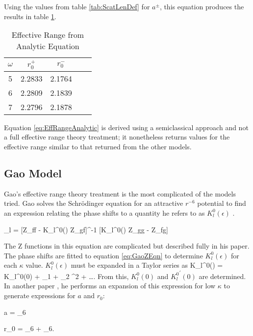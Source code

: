 \documentclass[Dissertation.tex]{subfiles}
\begin{document}
\noindent Using the values from table \ref{tab:ScatLenDef} for $a^\pm$, this equation produces the results in table \ref{tab:EffRangeArriola}.

\begin{table}[H]
\centering
\begin{tabular}{c c c c c}
\toprule
$\omega$ & $r_0^+$ & $r_0^-$ \\
\midrule
5 & 2.2833 & 2.1764 \\
6 & 2.2809 & 2.1839 \\
7 & 2.2796 & 2.1878 \\
\bottomrule
\end{tabular}
\caption{Effective Range from Analytic Equation}
\label{tab:EffRangeArriola}
\end{table}

Equation \ref{eq:EffRangeAnalytic} is derived using a semiclassical approach and not a full effective range theory treatment; it nonetheless returns values for the effective range similar to that returned from the other models.


\subsection{Gao Model}
Gao's effective range theory treatment is the most complicated of the models tried. Gao solves the Schr\"{o}dinger equation for an attractive $r^{-6}$ potential to find an expression relating the phase shifts to a quantity he refers to as $K_l^0(\epsilon)$ \cite{Gao1998}.

\beq
\label{eq:GaoZEqn}
\tan\delta_l = [Z_{ff} - K_l^0(\epsilon) Z_{gf}]^{-1} [K_l^0(\epsilon) Z_{gg} - Z_{fg}]
\eeq

\noindent The Z functions in this equation are complicated but described fully in his paper. The phase shifts are fitted to equation \ref{eq:GaoZEqn} to determine $K_l^0(\epsilon)$ for each $\kappa$ value. $K_l^0(\epsilon)$ must be expanded in a Taylor series as
\beq
\label{eq:GaoKTaylor}
K_l^0(\epsilon) = K_l^0(0) + \xi_1 \epsilon + \xi_2 \epsilon^2 + \ldots.
\eeq
From this, $K_l^0(0)$ and ${K_l^0}^\prime(0)$ are determined. In another paper \cite{Gao1998a}, he performs an expansion of this expression for low $\kappa$ to generate expressions for $a$ and $r_0$:

\beq
\label{eq:GaoScatLen}
a =   \beta_6
\eeq

\beq
\label{eq:GaoEffRange}
r_0 =   \beta_6 +   \beta_6.
\eeq
\end{document}
